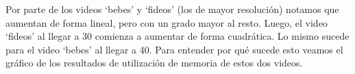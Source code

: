 \begin{figure}[ht]
	\begin{center}
	\end{center}
\end{figure}
\FloatBarrier
\par Por parte de los videos `bebes' y `fideos' (los de mayor resoluci\'on) notamos que aumentan de forma lineal, pero con un grado mayor al resto. Luego, el video `fideos' al llegar a 30 comienza a aumentar de forma cuadr\'atica. Lo mismo sucede para el video `bebes' al llegar a 40. Para entender por qu\'e sucede esto veamos el gr\'afico de los resultados de utilizaci\'on de memoria de estos dos videos.
\begin{figure}[ht]
	\begin{center}
	\end{center}
\end{figure}
